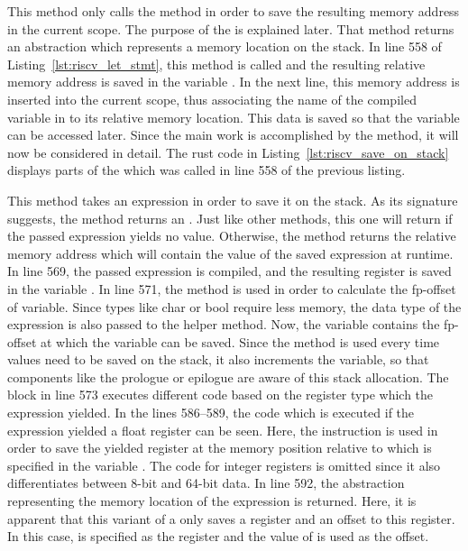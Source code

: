 
This method only calls the  method in order to save the resulting memory address in the current scope.
The purpose of the  is explained later.
That method returns an abstraction which represents a memory location on the stack.
In line 558 of Listing~\ref{lst:riscv_let_stmt}, this method is called and the resulting relative memory address is saved in the variable .
In the next line, this memory address is inserted into the current scope,
thus associating the name of the compiled variable in to its relative memory location.
This data is saved so that the variable can be accessed later.
Since the main work is accomplished by the  method, it will now be considered in detail.
The rust code in Listing~\ref{lst:riscv_save_on_stack} displays parts of the  which was called in line 558 of the previous listing.


This method takes an expression in order to save it on the stack.
As its signature suggests, the method returns an .
Just like other methods, this one will return  if the passed expression yields no value.
Otherwise, the method returns the relative memory address which will contain the value of the saved expression at runtime.
In line 569, the passed expression is compiled, and the resulting register is saved in the variable .
In line 571, the  method is used in order to calculate the fp-offset of variable.
Since types like char or bool require less memory, the data type of the expression is also passed to the helper method.
Now, the  variable contains the fp-offset at which the variable can be saved.
Since the  method is used every time values need to be saved on the stack,
it also increments the  variable, so that components like the prologue or epilogue are aware of this stack allocation.
The  block in line 573 executes different code based on the register type which the expression yielded.
In the lines 586--589, the code which is executed if the expression yielded a float register can be seen.
Here, the  instruction is used in order to save the yielded register at the memory position relative to  which is specified in the variable .
The code for integer registers is omitted since it also differentiates between 8-bit and 64-bit data.
In line 592, the  abstraction representing the memory location of the expression is returned.
Here, it is apparent that this variant of a  only saves a register and an offset to this register.
In this case,  is specified as the register and the value of  is used as the offset.

